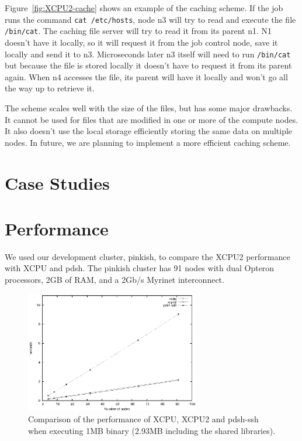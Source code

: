 \documentclass[10pt,conference,letterpaper]{IEEEtran}
\begin{document}
Figure~\ref{fig:XCPU2-cache} shows an example of the caching scheme. If the
job runs the command \texttt{cat /etc/hosts}, node n3 will try to read and
execute the file \texttt{/bin/cat}. The caching file server will try to read
it from its parent n1. N1 doesn't have it locally, so it will request it
from the job control node, save it locally and send it to n3. Microseconds
later n3 itself will need to run \texttt{/bin/cat} but because the file is
stored locally it doesn't have to request it from its parent again. When n4
accesses the file, its parent will have it locally and won't go all the way
up to retrieve it.

The scheme scales well with the size of the files, but has some major
drawbacks. It cannot be used for files that are modified in one or more of
the compute nodes. It also doesn't use the local storage efficiently storing
the same data on multiple nodes. In future, we are planning to implement a
more efficient caching scheme.

\section{Case Studies}





\section{Performance}

We used our development cluster, pinkish, to compare the XCPU2 performance
with XCPU and pdsh. The pinkish cluster has 91 nodes with dual Opteron
processors, 2GB of RAM, and a 2Gb/s Myrinet interconnect.

\begin{figure}[h]
\begin{center}
\includegraphics[width=3in, keepaspectratio]{results1.eps}
\end{center}
\caption{Comparison of the performance of XCPU, XCPU2 and pdsh-ssh when
executing 1MB binary (2.93MB including the shared libraries).}
\label{fig:XCPU-results1}
\end{figure}
\end{document}
